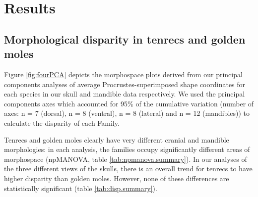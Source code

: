 \documentclass[12pt,a4paper]{article}
\begin{document}

\section{Results}


\subsection{Morphological disparity in tenrecs and golden moles} 
 
		
	
	
	Figure  \ref{fig:fourPCA} depicts the morphospace plots derived from our principal components analyses of average Procrustes-superimposed shape coordinates for each species in our skull and mandible data respectively. We used the principal components axes which accounted for 95\% of the cumulative variation (number of axes: n = 7 (dorsal), n = 8 (ventral), n = 8 (lateral) and n = 12 (mandibles)) to calculate the disparity of each Family. 

	Tenrecs and golden moles clearly have very different cranial and mandible morphologies: in each analysis, the families occupy significantly different areas of morphospace (npMANOVA, table \ref{tab:npmanova.summary}). In our analyses of the three different views of the skulls, there is an overall trend for tenrecs to have higher disparity than golden moles. However, none of these differences are statistically significant (table \ref{tab:disp.summary}). 
	
	
\end{document}
